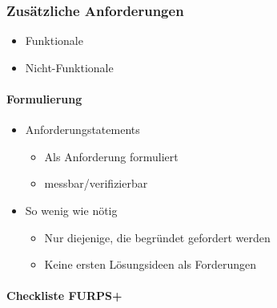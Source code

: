 \documentclass{article}
\begin{document}
\subsubsection{Zusätzliche Anforderungen}
\begin{itemize}
	\item Funktionale
	\item Nicht-Funktionale
\end{itemize}


\paragraph{Formulierung}

\begin{itemize}
	\item Anforderungstatements
	\begin{itemize}
		\item Als Anforderung formuliert
		\item messbar/verifizierbar
	\end{itemize}
	\item So wenig wie nötig
	\begin{itemize}
		\item Nur diejenige, die begründet gefordert werden
		\item Keine ersten Lösungsideen als Forderungen
	\end{itemize}
\end{itemize}


\paragraph{Checkliste FURPS+}
\end{document}
